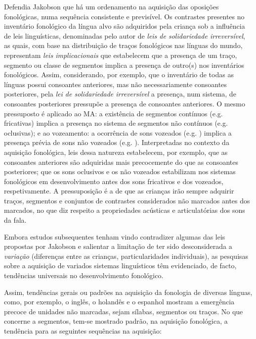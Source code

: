 \documentclass[output=paper]{LSP/langsci}
\begin{document}
Defendia Jakobson que há um ordenamento na aquisição das oposições fonológicas, numa sequência consistente e previsível. Os contrastes presentes no inventário fonológico da língua alvo são adquiridos pela criança sob a influência de leis linguísticas, denominadas pelo autor de \textit{leis de solidariedade irreversível}, as quais, com base na distribuição de traços fonológicos nas línguas do mundo, representam \textit{leis implicacionais} que estabelecem que a presença de um traço, segmento ou classe de segmentos implica a presença de outro(s) nos inventários fonológicos. Assim, considerando, por exemplo, que o inventário de todas as línguas possui consoantes anteriores, mas não necessariamente consoantes posteriores, pela \textit{lei de solidariedade irreversível} a presença, num sistema, de consoantes posteriores pressupõe a presença de consoantes anteriores. O mesmo pressuposto é aplicado ao MA: a existência de segmentos contínuos (e.g. fricativas) implica a presença no sistema de segmentos não contínuos (e.g. oclusivas); e ao vozeamento: a ocorrência de sons vozeados (e.g. ) implica a presença prévia de sons não vozeados (e.g. ). Interpretadas no contexto da aquisição fonológica, leis dessa natureza estabelecem, por exemplo, que as consoantes anteriores são adquiridas mais precocemente do que as consoantes posteriores; que os sons oclusivos e os não vozeados estabilizam nos sistemas fonológicos em desenvolvimento antes dos sons fricativos e dos vozeados, respetivamente. A pressuposição é a de que as crianças irão sempre adquirir traços, segmentos e conjuntos de contrastes considerados não marcados antes dos marcados, no que diz respeito a propriedades acústicas e articulatórias dos sons da fala.

Embora estudos subsequentes tenham vindo contradizer algumas das leis propostas por Jakobson e salientar a limitação de ter sido desconsiderada a \textit{variação} (diferenças entre as crianças, particularidades individuais), as pesquisas sobre a aquisição de variados sistemas linguísticos têm evidenciado, de facto, tendências universais no desenvolvimento fonológico. 

Assim, tendências gerais ou padrões na aquisição da fonologia de diversas línguas, como, por exemplo, o inglês, o holandês e o espanhol mostram a emergência precoce de unidades não marcadas, sejam sílabas, segmentos ou traços. No que concerne a segmentos, tem-se mostrado padrão, na aquisição fonológica, a tendência para as seguintes sequências na aquisição:
\end{document}
